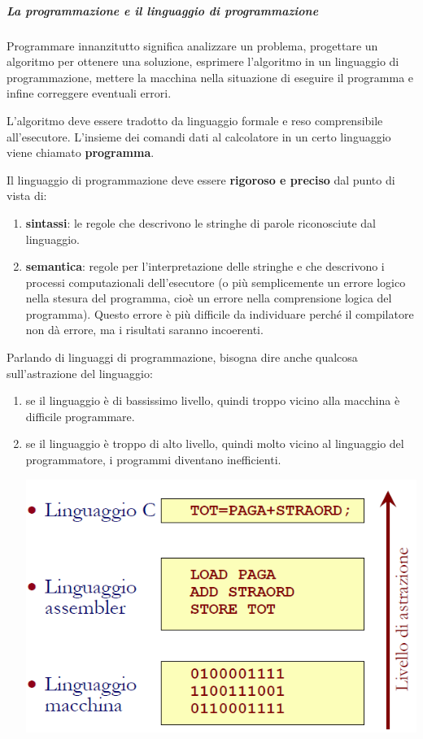 \documentclass[
  paper=a4,
  oneside  ,captions=tableheading
]{scrbook}
\providecommand{\tightlist}{%
  \setlength{\itemsep}{0pt}\setlength{\parskip}{0pt}}
\begin{document}
\hypertarget{la-programmazione-e-il-linguaggio-di-programmazione}{%
\subparagraph{La programmazione e il linguaggio di
programmazione}\label{la-programmazione-e-il-linguaggio-di-programmazione}}

Programmare innanzitutto significa analizzare un problema, progettare un
algoritmo per ottenere una soluzione, esprimere l'algoritmo in un
linguaggio di programmazione, mettere la macchina nella situazione di
eseguire il programma e infine correggere eventuali errori.

L'algoritmo deve essere tradotto da linguaggio formale e reso
comprensibile all'esecutore. L'insieme dei comandi dati al calcolatore
in un certo linguaggio viene chiamato \textbf{programma}.

Il linguaggio di programmazione deve essere \textbf{rigoroso e preciso}
dal punto di vista di:

\begin{enumerate}
\def\labelenumi{\arabic{enumi}.}
\tightlist
\item
  \textbf{sintassi}: le regole che descrivono le stringhe di parole
  riconosciute dal linguaggio.
\item
  \textbf{semantica}: regole per l'interpretazione delle stringhe e che
  descrivono i processi computazionali dell'esecutore (o più
  semplicemente un errore logico nella stesura del programma, cioè un
  errore nella comprensione logica del programma). Questo errore è più
  difficile da individuare perché il compilatore non dà errore, ma i
  risultati saranno incoerenti.
\end{enumerate}

Parlando di linguaggi di programmazione, bisogna dire anche qualcosa
sull'astrazione del linguaggio:

\begin{enumerate}
\def\labelenumi{\arabic{enumi}.}
\item
  se il linguaggio è di bassissimo livello, quindi troppo vicino alla
  macchina è difficile programmare.
\item
  se il linguaggio è troppo di alto livello, quindi molto vicino al
  linguaggio del programmatore, i programmi diventano inefficienti.

  \includegraphics{./image/image-20201111001022024.png}
\end{enumerate}
\end{document}
